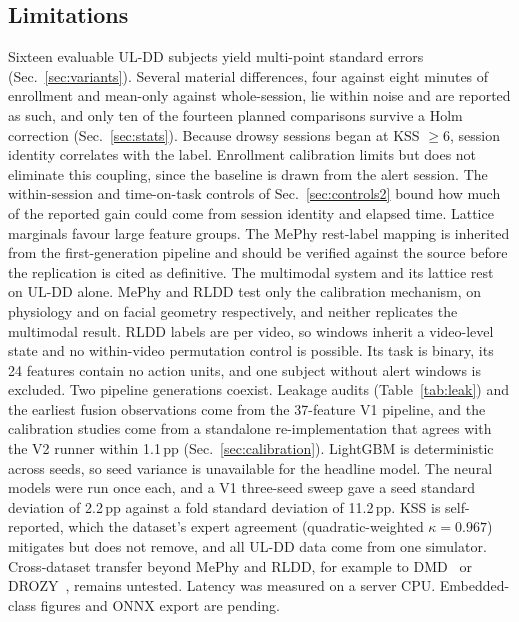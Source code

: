 \documentclass[journal]{IEEEtran}
\newcommand{\pp}{\,pp}
\begin{document}
\subsection{Limitations}
Sixteen evaluable UL-DD subjects yield multi-point standard errors
(Sec.~\ref{sec:variants}). Several material differences, four against eight
minutes of enrollment and mean-only against whole-session, lie within noise
and are reported as such, and only ten of the fourteen planned comparisons
survive a Holm correction (Sec.~\ref{sec:stats}). Because drowsy sessions
began at KSS $\ge 6$, session identity correlates with the label. Enrollment
calibration limits but does not eliminate this coupling, since the baseline is
drawn from the alert session. The within-session and time-on-task controls of
Sec.~\ref{sec:controls2} bound how much of the reported gain could come from
session identity and elapsed time. Lattice marginals favour large feature groups.
The MePhy rest-label mapping is inherited from the first-generation pipeline
and should be verified against the source before the replication is cited as
definitive. The multimodal system and its lattice rest on UL-DD alone. MePhy
and RLDD test only the calibration mechanism, on physiology and on facial
geometry respectively, and neither replicates the multimodal result. RLDD
labels are per video, so windows inherit a video-level state and no
within-video permutation control is possible. Its task is binary, its 24
features contain no action units, and one subject without alert windows is
excluded. Two pipeline generations coexist. Leakage audits
(Table~\ref{tab:leak}) and the earliest fusion observations come from the
37-feature V1 pipeline, and the calibration studies come from a standalone
re-implementation that agrees with the V2 runner within 1.1\pp{}
(Sec.~\ref{sec:calibration}). LightGBM is deterministic across seeds, so seed
variance is unavailable for the headline model. The neural models were run
once each, and a V1 three-seed sweep gave a seed standard deviation of
2.2\pp{} against a fold standard deviation of 11.2\pp. KSS is self-reported,
which the dataset's expert agreement (quadratic-weighted
$\kappa=0.967$)~\cite{bodaghi2026uldd} mitigates but does not remove, and all
UL-DD data come from one simulator. Cross-dataset transfer beyond MePhy and
RLDD, for example to DMD~\cite{ortega2020dmd} or DROZY~\cite{massoz2016drozy},
remains untested. Latency was measured on a server CPU. Embedded-class figures
and ONNX export are pending.
\end{document}
